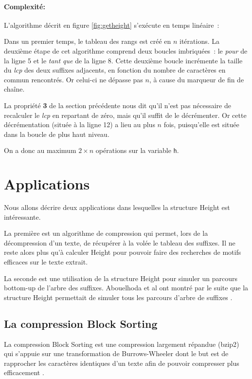 \documentclass[a4paper,10pt]{article}
\begin{document}
\paragraph{Complexité:\\}{L'algorithme décrit en figure
  \ref{fig:getheight} s'exécute en temps linéaire~:}

Dans un premier temps, le tableau des rangs est créé en $n$
itérations. La deuxième étape de cet algorithme comprend deux boucles
imbriquées~: le \textit{pour} de la ligne 5 et le \textit{tant que} de
la ligne 8. Cette deuxième boucle incrémente la taille du \textit{lcp}
des deux suffixes adjacents, en fonction du nombre de caractères en
commun rencontrés. Or celui-ci ne dépasse pas $n$, à cause du marqueur
de fin de chaîne.

La propriété \textbf{3} de la section précédente nous dit qu'il n'est
pas nécessaire de recalculer le \textit{lcp} en repartant de zéro,
mais qu'il suffit de le décrémenter. Or cette décrémentation (située à
la ligne 12) a lieu au plus $n$ fois, puisqu'elle est située dans la
boucle de plus haut niveau.

On a donc au maximum $2 \times n$ opérations sur la variable \texttt{h}.


\section{Applications}
\label{sec:appli}

Nous allons décrire deux applications dans lesquelles la structure
Height est intéressante. 

La première est un algorithme de compression
qui permet, lors de la décompression d'un texte, de récupérer à la
volée le tableau des suffixes. Il ne reste alors plus qu'à calculer
Height pour pouvoir faire des recherches de motifs efficaces sur le
texte extrait.

La seconde est une utilisation de la structure Height pour simuler un
parcours bottom-up de l'arbre des suffixes. Abouelhoda et al ont
montré par le suite que la structure Height permettait de simuler tous
les parcours d'arbre de suffixes \cite{Abouelhoda200453}.

\subsection{La compression Block Sorting}
\label{sec:blocksorting}

La compression Block Sorting est une compression largement répandue
(bzip2) qui s'appuie sur une transformation de Burrows-Wheeler
dont le but est de rapprocher les caractères identiques d'un texte
afin de pouvoir compresser plus efficacement \cite{Burrows94}.
\end{document}
